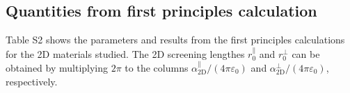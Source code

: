 \documentclass[manuscript=suppinfo,email=true,hyperref=true,keywords=false]{achemso}
\begin{document}
\subsection{Quantities from first principles calculation}

Table S2 shows the parameters and results from the
first principles calculations for the 2D materials studied. The 2D
screening lengthes $r_{0}^{\parallel}$ and $r_{0}^{\perp}$ can be
obtained by multiplying $2 \pi$ to the columns
$\alpha_{\mathrm{2D}}^{\parallel}/(4\pi \varepsilon_{0})$ and
$\alpha_{\mathrm{2D}}^{\perp}/(4\pi \varepsilon_{0})$, respectively.



\iffalse
\subsection{Density of States (DOS) plots for the materials studied}
\label{sec:DOS}




\subsection{Band structures of 2D materials calculated}
\label{sec:bs}


\fi

\clearpage{}
\section*{}
\label{sec:ref}

\end{document}
